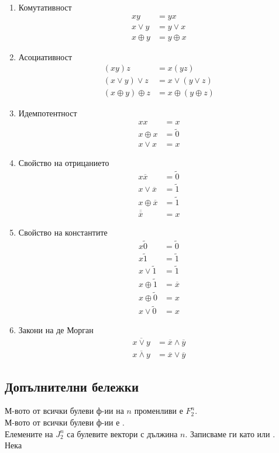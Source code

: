 \begin{enumerate}
    \item Комутативност
    \begin{align*}
        xy &= yx \\
        x \vee y &= y \vee x \\
        x \oplus y &= y \oplus x
    \end{align*}
    \item Асоциативност
    \begin{align*}
        (xy)z &= x(yz) \\
        (x \vee y) \vee z &= x \vee (y \vee z) \\
        (x \oplus y) \oplus z &= x \oplus (y \oplus z)
    \end{align*}
    \item Идемпотентност
    \begin{align*}
        xx &= x \\
        x \oplus x &= \tilde{0} \\
        x \vee x &= x
    \end{align*}
    \item Свойство на отрицанието
    \begin{align*}
        x\overline{x} &= \tilde{0} \\
        x \vee \overline{x} &= \tilde{1} \\
        x \oplus \overline{x} &= \tilde{1} \\
        \overline{\overline{x}} &= x
    \end{align*}
    \item Свойство на константите
    \begin{align*}
        x\tilde{0} &= \tilde{0} \\
        x\tilde{1} &= \tilde{1} \\
        x \vee \tilde{1} &= \tilde{1} \\
        x \oplus \tilde{1} &= \overline{x} \\
        x \oplus \tilde{0} &= x \\
        x \vee \tilde{0} &= x
    \end{align*}
    \item Закони на де Морган
    \begin{align*}
        \overline{x \vee y} &= \overline{x} \land \overline{y} \\
        \overline{x \land y} &= \overline{x} \vee \overline{y}
    \end{align*}
\end{enumerate}

\subsection*{Допълнителни бележки}
М-вото от всички булеви ф-ии на \(n\) променливи е \(F_2^n\). \\
М-вото от всички булеви ф-ии е . \\
Елемените на \(J_2^n\) са булевите вектори с дължина \(n\). Записваме ги като  
или . \\
Нека  \totw 